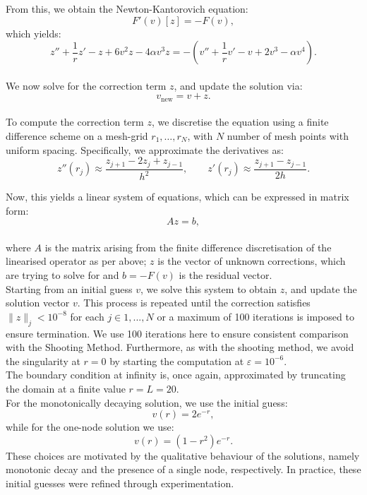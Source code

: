 \documentclass[12pt]{article}
\begin{document}
From this, we obtain the Newton-Kantorovich equation: 
\[
F'(v)[z] = -F(v),
\]
which yields: \\
\[
z'' + \frac{1}{r}z' - z + 6v^2 z - 4\alpha v^3 z
= -(v'' + \frac{1}{r}v' - v + 2v^3 - \alpha v^4).
\]\\

We now solve for the correction term $z$, and update the solution via: \\
\[
v_{\text{new}} = v + z.
\]\\

To compute the correction term $z$, we discretise the equation using a finite difference scheme on a mesh-grid $r_1, \dots, r_N$, with $N$ number of mesh points with uniform spacing. Specifically, we approximate the derivatives as: 
\[
z''(r_j) \approx \frac{z_{j+1} - 2z_j + z_{j-1}}{h^2}, \qquad
z'(r_j) \approx \frac{z_{j+1} - z_{j-1}}{2h}.
\]

Now, this yields a linear system of equations, which can be expressed in matrix form:\\
\[
A z = b,
\]\\
where $A$ is the matrix arising from the finite difference discretisation of the linearised operator as per above; $z$ is the vector of unknown corrections, which are trying to solve for and $b = -F(v)$ is the residual vector.\\

Starting from an initial guess $v$, we solve this system to obtain $z$, and update the solution vector $v$. This process is repeated until the correction satisfies $\|z\|_{j} < 10^{-8}$ for each $j \in {1,...,N}$ or a maximum of 100 iterations is imposed to ensure termination. We use 100 iterations here to ensure consistent comparison with the Shooting Method. Furthermore, as with the shooting method, we avoid the singularity at $r = 0$ by starting the computation at $\varepsilon = 10^{-6}$.\\

The boundary condition at infinity is, once again, approximated by truncating the domain at a finite value $r = L=20$.\\

For the monotonically decaying solution, we use the initial guess:
\[
v(r) = 2e^{-r},
\]
while for the one-node solution we use:
\[
v(r) = (1 - r^2)e^{-r}.
\]
These choices are motivated by the qualitative behaviour of the solutions, namely monotonic decay and the presence of a single node, respectively. In practice, these initial guesses were refined through experimentation. 
\end{document}
